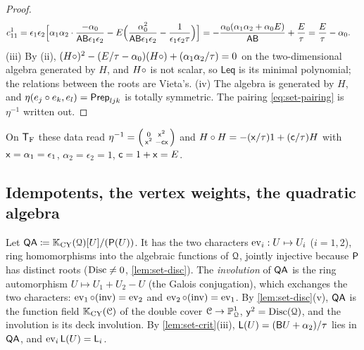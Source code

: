 \begin{proof}
\begin{align*}
c^1_{11}&=\epsilon_1\epsilon_2\Big[\alpha_1\alpha_2\cdot\frac{-\alpha_0}{\mathsf{A}\mathsf{B}\epsilon_1\epsilon_2}-E\Big(\frac{\alpha_0^2}{\mathsf{A}\mathsf{B}\epsilon_1\epsilon_2}-\frac{1}{\epsilon_1\epsilon_2\tau}\Big)\Big]=-\frac{\alpha_0(\alpha_1\alpha_2+\alpha_0E)}{\mathsf{A}\mathsf{B}}+\frac E\tau=\frac E\tau-\alpha_0 .
\end{align*}
(iii) By (ii), $(H\circ)^2-(E/\tau-\alpha_0)(H\circ)+(\alpha_1\alpha_2/\tau)=0$ on the two-dimensional algebra generated by $H$, and $H\circ$ is not scalar, so $\mathsf{Leq}$ is its minimal polynomial; the relations between the roots are Vieta's. (iv) The algebra is generated by $H$, and $\eta(e_j\circ e_k,e_l)=\mathsf{Prep}_{ljk}$ is totally symmetric. The pairing \eqref{eq:set-pairing} is $\eta^{-1}$ written out.
\end{proof}

 On $\mathsf{T}_{\mathrm{F}}$ these data read $\eta^{-1}=\begin{psmallmatrix}0&\mathsf{x}^2\\\mathsf{x}^2&-\mathsf{c}\mathsf{x}\end{psmallmatrix}$ and $H\circ H=-(\mathsf{x}/\tau)1+(\mathsf{c}/\tau)H$ with $\mathsf{x}=\alpha_1=\epsilon_1$, $\alpha_2=\epsilon_2=1$, $\mathsf{c}=1+\mathsf{x}=E$.

\subsection{Idempotents, the vertex weights, the quadratic algebra}
\label{sec:set-idem}

\begin{defn}
\label{def:set-QA}
Let $\mathsf{QA}\coloneqq\mathbb{K}_{\mathrm{CY}}(\mathcal{Q})[U]/(\mathsf{P}(U))$. It has the two characters $\operatorname{ev}_i:U\mapsto U_i$ ($i=1,2$), ring homomorphisms into the algebraic functions of $\mathcal{Q}$, jointly injective because $\mathsf{P}$ has distinct roots ($\operatorname{Disc}\neq0$, \cref{lem:set-disc}). The \emph{involution} of $\mathsf{QA}$ is the ring automorphism $U\mapsto U_1+U_2-U$ (the Galois conjugation), which exchanges the two characters: $\operatorname{ev}_1\circ(\text{inv})=\operatorname{ev}_2$ and $\operatorname{ev}_2\circ(\text{inv})=\operatorname{ev}_1$. By \cref{lem:set-disc}(v), $\mathsf{QA}$ is the function field $\mathbb{K}_{\mathrm{CY}}(\mathcal{C})$ of the double cover $\mathcal{C}\to\mathbb{P}^1_{\mathcal{Q}}$, $\mathsf{y}^2=\operatorname{Disc}(\mathcal{Q})$, and the involution is its deck involution. By \cref{lem:set-crit}(iii), $\mathsf{L}(U)=(\mathsf{B} U+\alpha_2)/\tau$ lies in $\mathsf{QA}$, and $\operatorname{ev}_i\mathsf{L}(U)=\mathsf{L}_i$.
\end{defn}

